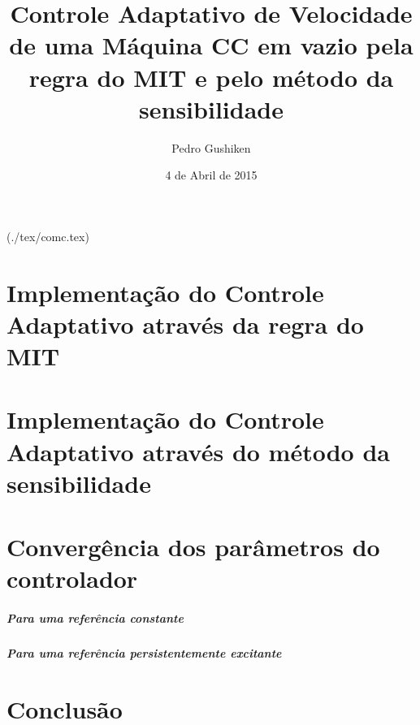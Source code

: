\documentclass[a4paper,10pt]{report}
\author{Pedro Gushiken}
\date{4 de Abril de 2015}
\title{Controle Adaptativo de Velocidade de uma Máquina CC em vazio pela regra do MIT e pelo m\'{e}todo da sensibilidade}
\begin{document}
\maketitle
  \tableofcontents
  (./tex/comc.tex)
  \chapter{Implementação do Controle Adaptativo através da regra do MIT}

  \chapter{Implementação do Controle Adaptativo através do método da sensibilidade}

  \chapter{Convergência dos parâmetros do controlador}
  \paragraph{Para uma referência constante}
  \paragraph{Para uma referência persistentemente excitante}
  \chapter{Conclusão}
\end{document}

